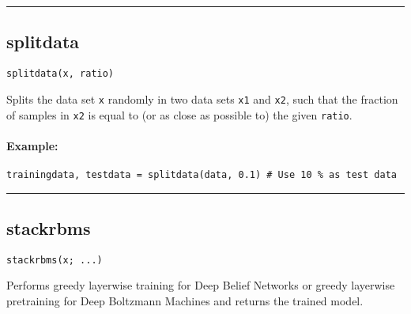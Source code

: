 \noindent\rule{\textwidth}{1pt}
\subsection*{splitdata}
\begin{verbatim}
splitdata(x, ratio)
\end{verbatim}
Splits the data set \texttt{x} randomly in two data sets \texttt{x1} and \texttt{x2}, such that the fraction of samples in \texttt{x2} is equal to (or as close as possible to) the given \texttt{ratio}.

\paragraph*{Example:}
\begin{verbatim}
trainingdata, testdata = splitdata(data, 0.1) # Use 10 % as test data
\end{verbatim}
\noindent\rule{\textwidth}{1pt}
\subsection*{stackrbms}
\begin{verbatim}
stackrbms(x; ...)
\end{verbatim}
Performs greedy layerwise training for Deep Belief Networks or greedy layerwise pretraining for Deep Boltzmann Machines and returns the trained model.

